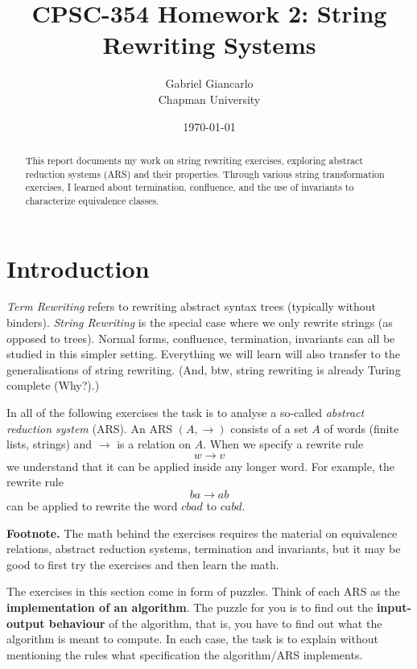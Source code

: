 \documentclass{article}
\title{CPSC-354 Homework 2: String Rewriting Systems}
\author{Gabriel Giancarlo \\ Chapman University}
\date{\today}
\theoremstyle{plain}
\theoremstyle{definition}
\theoremstyle{remark}
\begin{document}
\maketitle

\begin{abstract}
This report documents my work on string rewriting exercises, exploring abstract reduction systems (ARS) and their properties. Through various string transformation exercises, I learned about termination, confluence, and the use of invariants to characterize equivalence classes.
\end{abstract}

\setcounter{tocdepth}{3}
\tableofcontents

\section{Introduction}\label{intro}

\textit{Term Rewriting} refers to rewriting abstract syntax trees (typically without binders). 
\textit{String Rewriting} is the special case where we only rewrite strings (as opposed to trees). 
Normal forms, confluence, termination, invariants can all be studied in this simpler setting. 
Everything we will learn will also transfer to the generalisations of string rewriting. 
(And, btw, string rewriting is already Turing complete (Why?).)

\bigskip

In all of the following exercises the task is to analyse a so-called \textit{abstract reduction system} (ARS). 
An ARS $(A,\to)$ consists of a set $A$ of words (finite lists, strings) and $\to$ is a relation on $A$. 
When we specify a rewrite rule
\[
w \to v
\]
we understand that it can be applied inside any longer word. 
For example, the rewrite rule
\[
ba \to ab
\]
can be applied to rewrite the word $cbad$ to $cabd$.

\bigskip

\noindent\textbf{Footnote.} 
The math behind the exercises requires the material on equivalence relations, abstract reduction systems, termination and invariants, but it may be good to first try the exercises and then learn the math.

\bigskip

The exercises in this section come in form of puzzles. 
Think of each ARS as the \textbf{implementation of an algorithm}. 
The puzzle for you is to find out the \textbf{input-output behaviour} of the algorithm, that is, you have to find out what the algorithm is meant to compute. 
In each case, the task is to explain without mentioning the rules what specification the algorithm/ARS implements.
\end{document}
